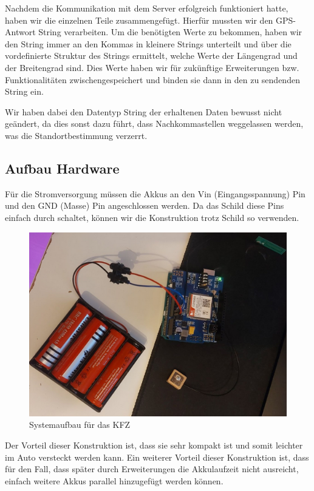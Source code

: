Nachdem die Kommunikation mit dem Server erfolgreich funktioniert hatte, haben wir die einzelnen Teile zusammengefügt. Hierfür mussten wir den GPS-Antwort String verarbeiten. Um die benötigten Werte zu bekommen, haben wir den String immer an den Kommas in kleinere Strings unterteilt und über die vordefinierte Struktur des Strings ermittelt, welche Werte der Längengrad und der Breitengrad sind. Dies Werte haben wir für zukünftige Erweiterungen bzw. Funktionalitäten zwischengespeichert und binden sie dann in den zu sendenden String ein.

Wir haben dabei den Datentyp String der erhaltenen Daten bewusst nicht geändert, da dies sonst dazu führt, dass Nachkommastellen weggelassen werden, was die Standortbestimmung verzerrt.

\subsection{Aufbau Hardware}
Für die Stromversorgung müssen die Akkus an den Vin (Eingangsspannung) Pin und den GND (Masse) Pin angeschlossen werden. Da das Schild diese Pins einfach durch schaltet, können wir die Konstruktion trotz Schild so verwenden.
\begin{figure} [H]
	\begin{center}
		\includegraphics[width=1\textwidth]{Bilder/Arduino_Aufbau.png}
		\caption{Systemaufbau für das KFZ}
		\label{hw-system}
	\end{center}
\end{figure}
Der Vorteil dieser Konstruktion ist, dass sie sehr kompakt ist und somit leichter im Auto versteckt werden kann. Ein weiterer Vorteil dieser Konstruktion ist, dass für den Fall, dass später durch Erweiterungen die Akkulaufzeit nicht ausreicht, einfach weitere Akkus parallel hinzugefügt werden können.

